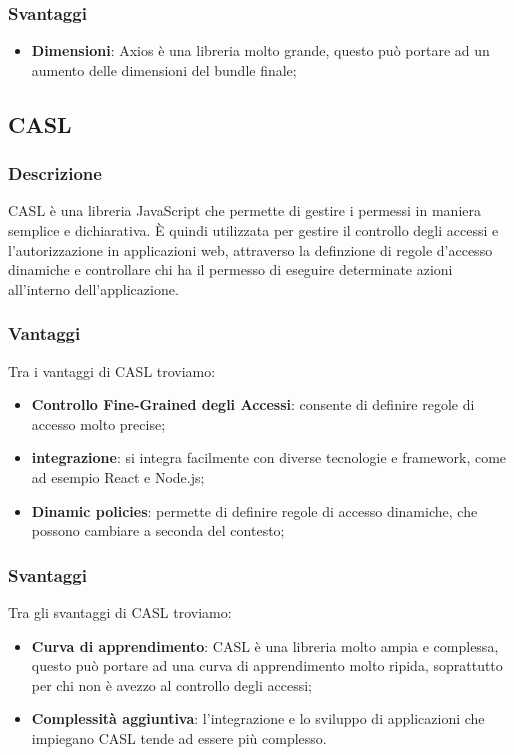\subsubsection*{Svantaggi}
\begin{itemize}
    \item \textbf{Dimensioni}: Axios è una libreria molto grande, questo può portare ad un aumento delle dimensioni del bundle finale;
\end{itemize}


\subsection*{CASL}

\subsubsection*{Descrizione}
CASL è una libreria JavaScript che permette di gestire i permessi in maniera semplice
e dichiarativa. È quindi utilizzata per gestire il controllo degli accessi e l'autorizzazione in applicazioni web, attraverso la definzione di regole d'accesso dinamiche e controllare chi ha il permesso di eseguire determinate azioni all'interno dell'applicazione.

\subsubsection*{Vantaggi}
Tra i vantaggi di CASL troviamo:
\begin{itemize}
    \item \textbf{Controllo Fine-Grained degli Accessi}: consente di definire regole di accesso molto precise;
    \item \textbf{integrazione}: si integra facilmente con diverse tecnologie e framework, come ad esempio React e Node.js;
    \item \textbf{Dinamic policies}: permette di definire regole di accesso dinamiche, che possono cambiare a seconda del contesto;
\end{itemize}

\subsubsection*{Svantaggi}
Tra gli svantaggi di CASL troviamo:
\begin{itemize}
    \item \textbf{Curva di apprendimento}: CASL è una libreria molto ampia e complessa, questo può portare ad una curva di apprendimento molto ripida, soprattutto per chi non è avezzo al controllo degli accessi;
    \item \textbf{Complessità aggiuntiva}: l'integrazione e lo sviluppo di applicazioni che impiegano CASL tende ad essere più complesso.
\end{itemize}


